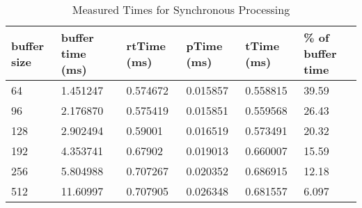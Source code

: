\begin{table}[H]
\begin{center}
\begin{tabular}{ |p{1.4cm}||p{1.5cm}|p{1.7cm}|p{1.7cm}|p{1.6cm}|p{1.4cm}|  }
 \hline
 buffer size    & buffer time (ms)    & rtTime (ms)   & pTime (ms)    & tTime (ms) & \% of buffer time\\
 \hline
 64             & 1.451247      & 0.574672          & 0.015857          & 0.558815      & 39.59 \\
 96             & 2.176870      & 0.575419          & 0.015851          & 0.559568      & 26.43 \\
 128            & 2.902494      & 0.59001           & 0.016519          & 0.573491      & 20.32 \\
 192            & 4.353741      & 0.67902           & 0.019013          & 0.660007      & 15.59 \\
 256            & 5.804988      & 0.707267          & 0.020352          & 0.686915      & 12.18 \\
 512            & 11.60997      & 0.707905          & 0.026348          & 0.681557      & 6.097 \\
 \hline
\end{tabular}
\end{center}
\caption{Measured Times for Synchronous Processing}
\label{tab:latency_comp}
\end{table}